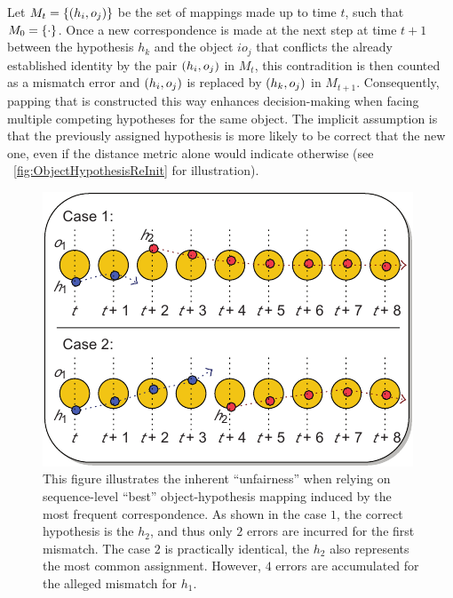 Let $M_t = \left\{ {\left( {h_i, o_j} \right)} \right\}$ be the set of mappings made up to time $t$, such that $M_0 = \left\{ {\cdot} \right\}$. Once a new correspondence is made at the next step at time $t + 1$ between the hypothesis $h_k$ and the object $io_j$ that conflicts the already established identity by the pair $\left( {h_i, o_j} \right)$ in $M_t$, this contradition is then counted as a mismatch error and $\left( {h_i, o_j} \right)$ is replaced by $\left( {h_k, o_j} \right)$ in $M_{t + 1}$. Consequently, papping that is constructed this way enhances decision-making when facing multiple competing hypotheses for the same object. The implicit assumption is that the previously assigned hypothesis is more likely to be correct that the new one, even if the distance metric alone would indicate otherwise (see \figstr{}~\ref{fig:ObjectHypothesisReInit} for illustration).

\begin{figure}[t]
    \centerline{\includegraphics[width=0.5\linewidth]{figures/theoretical_foundations/seq_based_correspondence_issues.pdf}}
    \caption[Sequence-based correspondence mismatches]{This figure illustrates the inherent ``unfairness'' when relying on sequence-level ``best'' object-hypothesis mapping induced by the most frequent correspondence. As shown in the case $1$, the correct hypothesis is the $h_2$, and thus only $2$ errors are incurred for the first mismatch. The case $2$ is practically identical, the $h_2$ also represents the most common assignment. However, $4$ errors are accumulated for the alleged mismatch for $h_1$. }
    \label{fig:SeqLevelMostCommonCorrespondenceProb}
\end{figure}

